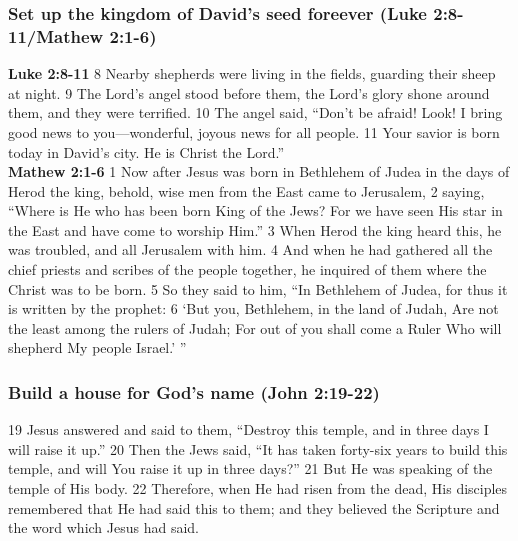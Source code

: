 \subsubsection{Set up the kingdom of David's seed foreever (Luke 2:8-11/Mathew 2:1-6)}
\textbf{Luke 2:8-11} 8 Nearby shepherds were living in the fields, guarding their sheep at night. 9 The Lord’s angel stood before them, the Lord’s glory shone around them, and they were terrified. 10 The angel said, “Don’t be afraid! Look! I bring good news to you—wonderful, joyous news for all people. 11 Your savior is born today in David’s city. He is Christ the Lord.”\\
\textbf{Mathew 2:1-6} 1 Now after Jesus was born in Bethlehem of Judea in the days of Herod the king, behold, wise men from the East came to Jerusalem, 2 saying, “Where is He who has been born King of the Jews? For we have seen His star in the East and have come to worship Him.”
3 When Herod the king heard this, he was troubled, and all Jerusalem with him. 4 And when he had gathered all the chief priests and scribes of the people together, he inquired of them where the Christ was to be born.
5 So they said to him, “In Bethlehem of Judea, for thus it is written by the prophet:
6 ‘But you, Bethlehem, in the land of Judah,
Are not the least among the rulers of Judah;
For out of you shall come a Ruler
Who will shepherd My people Israel.’ ”

\subsubsection{Build a house for God's name (John 2:19-22)}
19 Jesus answered and said to them, “Destroy this temple, and in three days I will raise it up.”
20 Then the Jews said, “It has taken forty-six years to build this temple, and will You raise it up in three days?”
21 But He was speaking of the temple of His body. 22 Therefore, when He had risen from the dead, His disciples remembered that He had said this to them; and they believed the Scripture and the word which Jesus had said.\\

